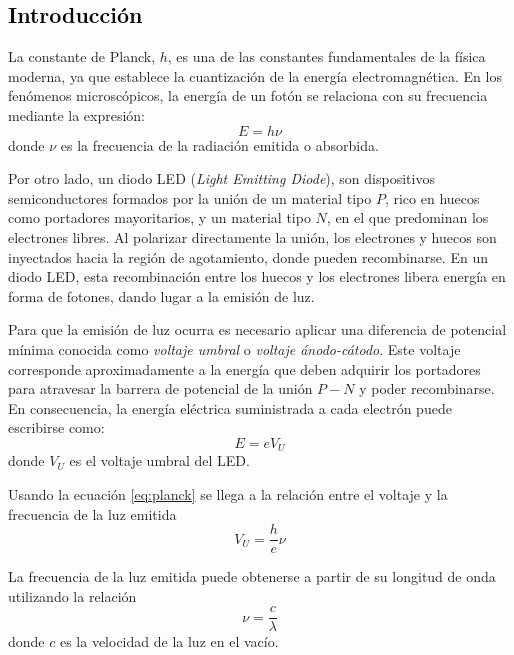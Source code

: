 \textcolor{black}{\section{Introducción}}

\noindent La constante de Planck, $h$, es una de las constantes fundamentales de la física moderna, ya que establece la cuantización de la energía electromagnética. En los fenómenos microscópicos, la energía de un fotón se relaciona con su frecuencia mediante la expresión:
\begin{equation}\label{eq:planck}
	E=h \nu
\end{equation}
donde $\nu$ es la frecuencia de la radiación emitida o absorbida.

Por otro lado, un diodo LED (\textit{Light Emitting Diode}), son dispositivos semiconductores formados por la unión de un material tipo $P$, rico en huecos como portadores mayoritarios, y un material tipo $N$, en el que predominan los electrones libres. Al polarizar directamente la unión, los electrones y huecos son inyectados hacia la región de agotamiento, donde pueden recombinarse. En un diodo LED, esta recombinación entre los huecos y los electrones libera energía en forma de fotones, dando lugar a la emisión de luz. \cite{Ziel}

Para que la emisión de luz ocurra es necesario aplicar una diferencia de potencial mínima conocida como \textit{voltaje umbral} o \textit{voltaje ánodo-cátodo}. Este voltaje corresponde aproximadamente a la energía que deben adquirir los portadores para atravesar la barrera de potencial de la unión $P-N$ y poder recombinarse. En consecuencia, la energía eléctrica suministrada a cada electrón puede escribirse como:
\begin{equation}
	E = eV_U
\end{equation}
donde $V_U$ es el voltaje umbral del LED.

Usando la ecuación \eqref{eq:planck} se llega a la relación entre el voltaje y la frecuencia de la luz emitida
\begin{equation}\label{eq:volt_u}
	V_U =  \frac{h}{e} \nu
\end{equation}

La frecuencia de la luz emitida puede obtenerse a partir de su longitud de onda utilizando la relación
\begin{equation}\label{eq:frec}
	\nu = \frac{c}{\lambda}
\end{equation}
donde $c$ es la velocidad de la luz en el vacío.

